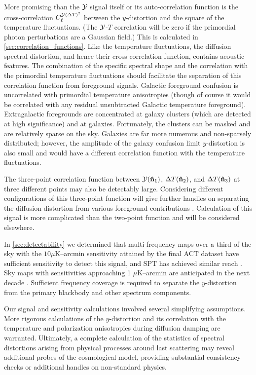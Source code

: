 \documentclass[fleqn,usenatbib]{mnras}
\begin{document}
    More promising than the $\mathcal{Y}$ signal itself or its auto-correlation function
    is the cross-correlation $C_\ell^{\mathcal{Y} ({\Delta T})^2}$ between the
    $y$-distortion and the square of the temperature fluctuations.
    (The $\mathcal{Y}$-$T$ correlation will be zero if the primordial photon
    perturbations are a Gaussian field.) This is calculated in
    \autoref{sec:correlation_functions}.  Like the temperature fluctuations, the
    diffusion spectral distortion, and hence their cross-correlation function,
    contains acoustic features.  The combination of the specific spectral shape
    and the correlation with the primordial temperature fluctuations should
    facilitate the separation of this correlation function from foreground
    signals.  Galactic foreground confusion is uncorrelated with primordial
    temperature anisotropies (though of course it would be correlated with any
    residual unsubtracted Galactic temperature foreground).  Extragalactic
    foregrounds are concentrated at galaxy clusters (which are detected at high
    significance) and at galaxies.  Fortunately, the clusters can be masked and
    are relatively sparse on the sky.  Galaxies are far more numerous and
    non-sparsely distributed; however, the amplitude of the galaxy confusion
    limit $y$-distortion is also small and would have a different correlation
    function with the temperature fluctuations.

    The three-point correlation function between $\mathcal{Y}({\bf\hat{n}}_1)$,
    ${\Delta T}({\bf\hat{n}}_2)$, and ${\Delta T}({\bf\hat{n}}_3)$ at three different points may
    also be detectably large.  Considering different configurations of this
    three-point function will give further handles on separating the diffusion
    distortion from various foreground contributions \citep{Coulton+2018}.
    Calculation of this signal is more complicated than the two-point function
    and will be considered elsewhere.

    In \autoref{sec:detectability} we determined that multi-frequency maps over
    a third of the sky with the $10\mu$K--arcmin sensitivity attained by the
    final ACT dataset \citep{Coulton+2023} have sufficient sensitivity to
    detect this signal, and SPT has achieved similar reach \citep{SPTymap}.
    Sky maps with sensitivities approaching 1 $\mu$K--arcmin are anticipated in
    the next decade \citep{Abitbol+2017cmbs4}.  Sufficient frequency coverage is
    required to separate the $y$-distortion from the primary blackbody and other
    spectrum components.

    Our signal and sensitivity calculations involved several simplifying
    assumptions.  More rigorous calculations of the $y$-distortion and its
    correlation with the temperature and polarization anisotropies during
    diffusion damping are warranted.  Ultimately, a complete calculation of the
    statistics of spectral distortions arising from physical processes around
    last scattering may reveal additional probes of the cosmological model,
    providing substantial consistency checks or additional handles on
    non-standard physics.
\end{document}
